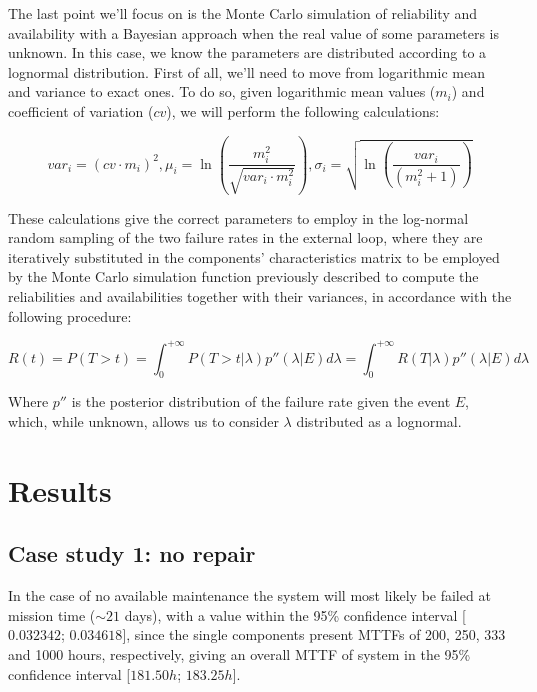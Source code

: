 \documentclass[a4paper,11pt]{article}
\begin{document}
The last point we'll focus on is the Monte Carlo simulation of reliability and
availability with a Bayesian approach when the real value of some parameters is
unknown. In this case, we know the parameters are distributed according to a
lognormal distribution. First of all, we'll need to move from logarithmic mean
and variance to exact ones. To do so, given logarithmic mean values ($m_i$) and
coefficient of variation ($cv$), we will perform the following calculations:

\begin{equation}
    var_i = {\left(cv \cdot m_i \right)}^2 ,
    \mu_i = \ln \left(\frac{m_i^2}{\sqrt{var_i\cdot m_i^2}}\right),
    \sigma_i = \sqrt{\ln\left(\frac{var_i}{(m_i^2+1)}\right)}
\end{equation}

These calculations give the correct parameters to employ in the log-normal
random sampling of the two failure rates in the external loop, where they are
iteratively substituted in the components' characteristics matrix to be employed
by the Monte Carlo simulation function previously described to compute the
reliabilities and availabilities together with their variances, in accordance
with the following procedure:

\begin{equation}
    R(t) = P(T>t) = \int_0^{+\infty} P(T>t|\lambda)p''(\lambda|E)d\lambda = \int_0^{+\infty} R(T|\lambda)p''(\lambda|E)d\lambda
\end{equation}

Where $p''$ is the posterior distribution of the failure rate given the event
$E$, which, while unknown, allows us to consider $\lambda$ distributed as a
lognormal.

\section{Results}

\subsection{Case study 1: no repair}

In the case of no available maintenance the system will most likely be failed at
mission time ($\sim21$ days), with a value within the 95\% confidence interval
[$0.032342$; $0.034618$], since the single components present MTTFs of 200, 250,
333 and 1000 hours, respectively, giving an overall MTTF of system in the 95\%
confidence interval [$181.50h$; $183.25h$].
\end{document}
